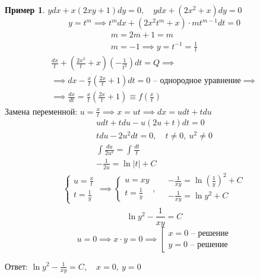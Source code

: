 \documentclass[11pt,a4paper,oneside]{report}
\theoremstyle{definition}
\newtheorem{example}{Пример}
\theoremstyle{plain}
\theoremstyle{remark}
\begin{document}
\begin{example}
    $ydx + x(2xy + 1)dy = 0, \quad ydx + (2x^2 + x)dy = 0$
    \begin{equation*}
        y = t^m \implies t^mdx + (2x^2t^m + x)\cdot mt^{m-1}dt = 0
    \end{equation*}
    \begin{align*}
        m = 2m + 1 = m \\
        m = -1 \implies y = t^{-1} = \frac{1}{t}
    \end{align*}
    \begin{multline*}
        \frac{dx}{t} + \left(\frac{2x^2}{t} + x\right)\left(-\frac{1}{t^2}\right)dt = Q \implies \\
        \implies dx - \frac{x}{t}\left(\frac{2x}{t} + 1\right)dt = 0\text{ -- однородное уравнение}\implies \\
        \implies \frac{dx}{dt}=\frac{x}{t}\left(\frac{2x}{t} + 1\right)\equiv f\left(\frac{x}{t}\right)
    \end{multline*}
    Замена переменной: $u = \frac{x}{t}\implies x = ut \implies dx = udt + tdu$
    \begin{align*}
        udt + tdu - u(2u + t)dt = 0               \\
        tdu - 2u^2dt = 0, \quad t\ne0, \ u^2\ne 0 \\
        \int \frac{du}{2u^2} = \int \frac{dt}{t}  \\
        -\frac{1}{2u} = \ln|t| + C
    \end{align*}
    \begin{equation*}
        \left\{\begin{array}{l}
            u = \frac{x}{t} \\
            t=\frac{1}{y}
        \end{array}\right. \implies \left\{\begin{array}{l}
            u = xy \\ t = \frac{1}{y}
        \end{array}\right., \quad \begin{array}{l}
            -\frac{1}{xy} = \ln \left(\frac{1}{y}\right)^2 + C \\
            -\frac{1}{xy} = \ln y^2 + C                        \\
        \end{array}
    \end{equation*}
    \begin{equation*}
        \ln y^2 - \frac{1}{xy} = C
    \end{equation*}
    \begin{equation*}
        u = 0 \implies x\cdot y = 0 \implies \left[\begin{array}{l}
            x = 0\text{ -- решение} \\
            y = 0\text{ -- решение}
        \end{array}\right.
    \end{equation*}

    Ответ: $\ln y^2 - \frac{1}{xy} = C, \quad x=0, \ y=0$
\end{example}
\end{document}
